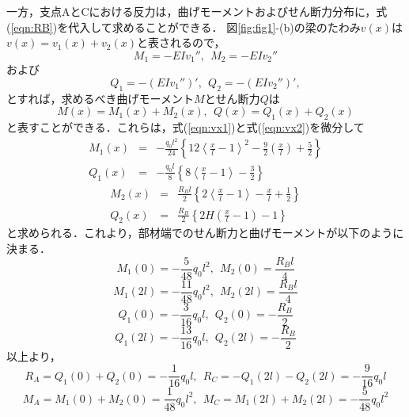 \documentclass[10pt,a4j]{jarticle}
\begin{document}
\begin{enumerate}
一方，支点AとCにおける反力は，曲げモーメントおよびせん断力分布に，式(\ref{eqn:RB})を代入して求めることができる．
図\ref{fig:fig1}-(b)の梁のたわみ$v(x)$は$v(x)=v_1(x)+v_2(x)$と表されるので，
\begin{equation}
	M_1=-EIv_1'', \ \ M_2=-EIv_2''
\end{equation}
および
\begin{equation}
	Q_1=-(EIv_1'')', \ \ Q_2=-(EIv_2'')',
\end{equation}
とすれば，求めるべき曲げモーメント$M$とせん断力$Q$は
\begin{equation}
	M(x)=M_1(x)+M_2(x),  \  \
	Q(x)=Q_1(x)+Q_2(x)
\end{equation}
と表すことができる．これらは，式(\ref{eqn:vx1})と式(\ref{eqn:vx2})を微分して
\begin{eqnarray}
	M_1(x) & =& 
	-\frac{q_0l^2}{24}\left\{ 
	12\left<\frac{x}{l}-1\right>^2 - \frac{9}{2}\left(\frac{x}{l}\right) + \frac{5}{2}
	\right\}
	\label{eqn:M1}
	\\
	Q_1(x) & =& 
	-\frac{q_0l}{8}\left\{ 
	8\left<\frac{x}{l}-1\right> - \frac{3}{2}
	\right\}
	\label{eqn:Q1}
\end{eqnarray}
\begin{eqnarray}
	M_2(x) & =& 
	\frac{R_Bl}{2}\left\{ 
	2\left<\frac{x}{l} - 1\right> -\frac{x}{l} + \frac{1}{2}
	\right\}
	\label{eqn:M2}
	\\
	Q_2(x) & =& 
	\frac{R_B}{2}\left\{ 
	2H\left(\frac{x}{l}-1\right)-1
	\right\}
	\label{eqn:Q2}
\end{eqnarray}
と求められる．これより，部材端でのせん断力と曲げモーメントが以下のように決まる．
\begin{equation}
	M_1(0)=-\frac{5}{48}q_0l^2, \ \ M_2(0)=\frac{R_Bl}{4}
\end{equation}
\begin{equation}
	M_1(2l)=-\frac{11}{48}q_0l^2, \ \ M_2(2l)=\frac{R_Bl}{4}
\end{equation}
\begin{equation}
	Q_1(0)=-\frac{3}{16}q_0l, \ \ Q_2(0)=-\frac{R_B}{2}
\end{equation}
\begin{equation}
	Q_1(2l)=-\frac{13}{16}q_0l, \ \ Q_2(2l)=-\frac{R_B}{2}
\end{equation}
以上より，
\begin{equation}
	R_A=Q_1(0)+Q_2(0)= -\frac{1}{16}q_0l, \ \ R_C=-Q_1(2l)-Q_2(2l)=-\frac{9}{16}q_0l
\end{equation}
\begin{equation}
	M_A=M_1(0)+M_2(0)= \frac{1}{48}q_0l^2, \ \ M_C=M_1(2l)+M_2(2l)=-\frac{5}{48}q_0l^2

\end{equation}
\end{enumerate}
\end{document}
